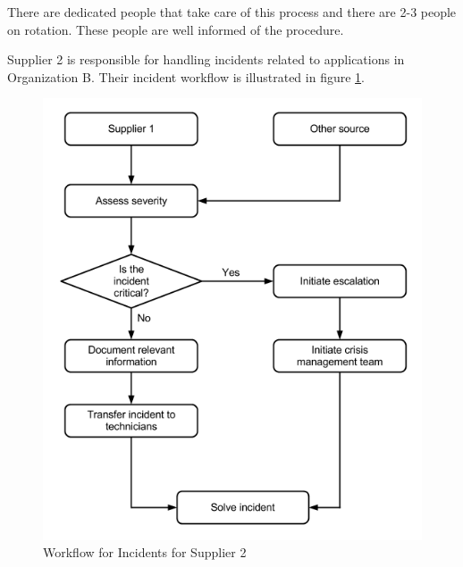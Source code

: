 \documentclass[b5paper, twoside, openright, 11pt]{report}
\begin{document}
There are dedicated people that take care of this process and there are 2-3 people on rotation. These people are well informed of the procedure.  


Supplier 2 is responsible for handling incidents related to applications in Organization B. Their incident workflow is illustrated in figure \ref{fig:WorkflowCaseBSupplier2}.

\begin{figure}[H]
\begin{center}
\includegraphics[scale=0.54]{WorkflowCaseBSupplier2.png}
\caption[Workflow for Incidents, Case B Supplier 2]{Workflow for Incidents for Supplier 2}
\label{fig:WorkflowCaseBSupplier2}
\end{center}
\end{figure}
\end{document}
